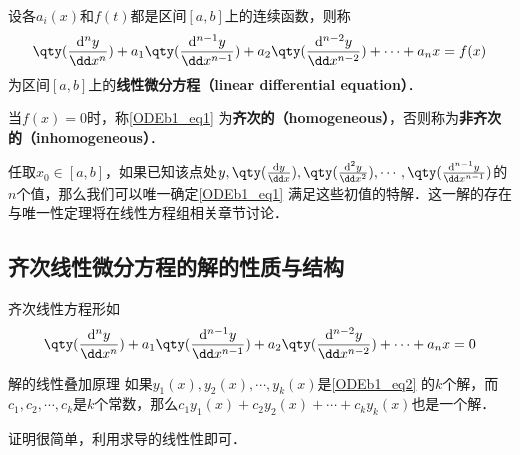 
\begin{definition}{}
设各$a_i(x)$和$f(t)$都是区间$[a, b]$上的连续函数，则称
\begin{equation}\label{ODEb1_eq1}
\qty(\frac{\mathrm{d}^n y}{\dd x^n})+a_1\qty(\frac{\mathrm{d}^{n-1} y}{\dd x^{n-1}})+a_2\qty(\frac{\mathrm{d}^{n-2} y}{\dd x^{n-2}})+\cdots+a_nx=f(x)
\end{equation}
为区间$[a, b]$上的\textbf{线性微分方程（linear differential equation）}．

当$f(x)=0$时，称\autoref{ODEb1_eq1} 为\textbf{齐次的（homogeneous）}，否则称为\textbf{非齐次的（inhomogeneous）}．
\end{definition}

任取$x_0\in[a, b]$，如果已知该点处$y, \qty(\frac{\mathrm{d} y}{\dd x}), \qty(\frac{\mathrm{d}^{2} y}{\dd x^{2}}), \cdots, \qty(\frac{\mathrm{d}^{n-1} y}{\dd x^{n-1}})$的$n$个值，那么我们可以唯一确定\autoref{ODEb1_eq1} 满足这些初值的特解．这一解的存在与唯一性定理将在线性方程组相关章节讨论．


\subsection{齐次线性微分方程的解的性质与结构}

齐次线性方程形如
\begin{equation}\label{ODEb1_eq2}
\qty(\frac{\mathrm{d}^n y}{\dd x^n})+a_1\qty(\frac{\mathrm{d}^{n-1} y}{\dd x^{n-1}})+a_2\qty(\frac{\mathrm{d}^{n-2} y}{\dd x^{n-2}})+\cdots+a_nx=0
\end{equation}

\begin{theorem}{解的线性叠加原理}
如果$y_1(x), y_2(x), \cdots, y_k(x)$是\autoref{ODEb1_eq2} 的$k$个解，而$c_1, c_2, \cdots, c_k$是$k$个常数，那么$c_1y_1(x)+c_2y_2(x)+\cdots+c_ky_k(x)$也是一个解．
\end{theorem}

证明很简单，利用求导的线性性即可．















